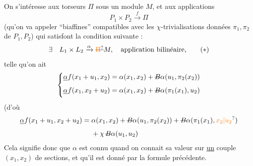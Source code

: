 On s'intéresse aux torseurs $\Pi$ sous un module $M$, et aux applications
\[
P_1\times P_2\xrightarrow{f}\Pi
\]
(qu'on va appeler ``biaffines'' compatibles avec les $\chi$-trivialisations données $\pi_1,\pi_2$ de $P_1,P_2$) qui satisfont la condition suivante :
\[
\exists\quad L_1\times L_2\xrightarrow{\alpha}\deleted{\unsure{\Pi}}M,\quad\text{application bilinéaire,}\tag*{$(*)$}
\]
telle qu'on ait
\[
\left\{\begin{aligned}
\deleted{\alpha}f(x_1+u_1,x_2)&=\alpha(x_1,x_2)+\deleted{B}\alpha(u_1,\pi_2(x_2))\\
\deleted{\alpha}f(x_1,x_2+u_2)&=\alpha(x_1,x_2)+\deleted{B}\alpha(\pi_1(x_1),u_2)
\end{aligned}\right.
\]
(d'où
\[
\begin{aligned}
\deleted{\alpha}f(x_1+u_1,x_2+u_2)={}&\alpha(x_1,x_2)+\deleted{B}\alpha(u_1,\pi_2(x_2))+
\deleted{B}\alpha(\pi_1(x_1),\unsure{x_2|u_2})\\
&+\chi\,\deleted{B}\alpha(u_1,u_2)
\end{aligned}
\]
Cela signifie donc que $\alpha$ est connu  quand on connait sa valeur sur \uline{un} couple $(x_1,x_2)$ de sections, et qu'il est donné par la formule précédente.

